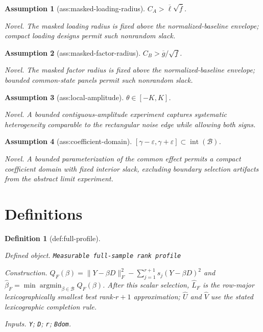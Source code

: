 \documentclass{article}
\newtheorem{assumption}{Assumption}
\newtheorem{definition}{Definition}
\begin{document}
\begin{assumption}[ass:masked-loading-radius]\label{ass:masked-loading-radius}
\(C_A>\overline\ell\sqrt{\overline f}\).
\par\smallskip\noindent\emph{Novel.} The masked loading radius is fixed above the normalized-baseline envelope; compact loading designs permit such nonrandom slack.
\end{assumption}

\begin{assumption}[ass:masked-factor-radius]\label{ass:masked-factor-radius}
\(C_B>\overline g/\sqrt{\underline f}\).
\par\smallskip\noindent\emph{Novel.} The masked factor radius is fixed above the normalized-baseline envelope; bounded common-state panels permit such nonrandom slack.
\end{assumption}

\begin{assumption}[ass:local-amplitude]\label{ass:local-amplitude}
\(\theta\in[-K,K]\).
\par\smallskip\noindent\emph{Novel.} A bounded contiguous-amplitude experiment captures systematic heterogeneity comparable to the rectangular noise edge while allowing both signs.
\end{assumption}

\begin{assumption}[ass:coefficient-domain]\label{ass:coefficient-domain}
\([\gamma-\varepsilon,\gamma+\varepsilon]\subset\operatorname{int}(\mathcal B)\).
\par\smallskip\noindent\emph{Novel.} A bounded parameterization of the common effect permits a compact coefficient domain with fixed interior slack, excluding boundary selection artifacts from the abstract limit experiment.
\end{assumption}

\section{Definitions}

\begin{definition}[def:full-profile]\label{def:full-profile}
\par\smallskip\noindent\emph{Defined object.} \texttt{Measurable full-\allowbreak{}sample rank profile}
\par\smallskip\noindent\emph{Construction.} \(Q_F(\beta)=\|Y-\beta D\|_F^2-\sum_{j=1}^{r+1}s_j(Y-\beta D)^2\) and \(\widehat\beta_F=\min\operatorname*{argmin}_{\beta\in\mathcal B}Q_F(\beta)\). After this scalar selection, \(\widehat L_F\) is the row-major lexicographically smallest best rank-\(r+1\) approximation; \(\widehat U\) and \(\widehat V\) use the stated lexicographic completion rule.
\par\smallskip\noindent\emph{Inputs.} \texttt{Y}; \texttt{D}; \texttt{r}; \texttt{Bdom}.
\end{definition}
\end{document}
